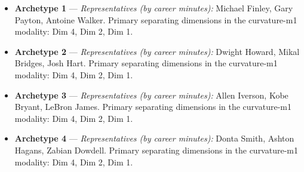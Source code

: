 \begin{itemize}
\item \textbf{Archetype 1} --- \emph{Representatives (by career minutes):} Michael Finley, Gary Payton, Antoine Walker. Primary separating dimensions in the curvature-m1 modality: Dim 4, Dim 2, Dim 1.
\item \textbf{Archetype 2} --- \emph{Representatives (by career minutes):} Dwight Howard, Mikal Bridges, Josh Hart. Primary separating dimensions in the curvature-m1 modality: Dim 4, Dim 2, Dim 1.
\item \textbf{Archetype 3} --- \emph{Representatives (by career minutes):} Allen Iverson, Kobe Bryant, LeBron James. Primary separating dimensions in the curvature-m1 modality: Dim 4, Dim 2, Dim 1.
\item \textbf{Archetype 4} --- \emph{Representatives (by career minutes):} Donta Smith, Ashton Hagans, Zabian Dowdell. Primary separating dimensions in the curvature-m1 modality: Dim 4, Dim 2, Dim 1.
\end{itemize}

